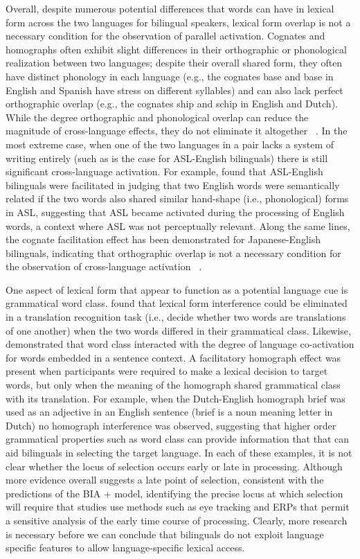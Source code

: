 Overall, despite numerous potential differences that words can have in lexical form across the two languages for bilingual speakers, lexical form overlap is not a necessary condition for the observation of parallel activation. Cognates and homographs often exhibit slight differences in their orthographic or phonological realization between two languages; despite their overall shared form, they often have distinct phonology in each language (e.g., the cognates base and base in English and Spanish have stress on different syllables) and can also lack perfect orthographic overlap (e.g., the cognates ship and schip in English and Dutch). While the degree orthographic and phonological overlap can reduce the magnitude of cross-language effects, they do not eliminate it altogether ~\citep[e.g.,][]{VanAssche2010}. In the most extreme case, when one of the two languages in a pair lacks a system of writing entirely (such as is the case for ASL-English bilinguals) there is still significant cross-language activation. For example,  \citet{Morford2011} found that ASL-English bilinguals were facilitated in judging that two English words were semantically related if the two words also shared similar hand-shape (i.e., phonological) forms in ASL, suggesting that ASL became activated during the processing of English words, a context where ASL was not perceptually relevant. Along the same lines, the cognate facilitation effect has been demonstrated for Japanese-English bilinguals, indicating that orthographic overlap is not a necessary condition for the observation of cross-language activation ~\citep{Hoshino2008,Voga2007}. 

One aspect of lexical form that appear to function as a potential language cue is grammatical word class.  \citet{Sunderman2006} found that lexical form interference could be eliminated in a translation recognition task (i.e., decide whether two words are translations of one another) when the two words differed in their grammatical class. Likewise,  \citet{Baten2010} demonstrated that word class interacted with the degree of language co-activation for words embedded in a sentence context. A facilitatory homograph effect was present when participants were required to make a lexical decision to target words, but only when the meaning of the homograph shared grammatical class with its translation. For example, when the Dutch-English homograph brief was used as an adjective in an English sentence (brief is a noun meaning letter in Dutch) no homograph interference was observed, suggesting that higher order grammatical properties such as word class can provide information that that can aid bilinguals in selecting the target language. In each of these examples, it is not clear whether the locus of selection occurs early or late in processing. Although more evidence overall suggests a late point of selection, consistent with the predictions of the BIA + model, identifying the precise locus at which selection will require that studies use methods such as eye tracking and ERPs that permit a sensitive analysis of the early time course of processing. Clearly, more research is necessary before we can conclude that bilinguals do not exploit language specific features to allow language-specific lexical access.

